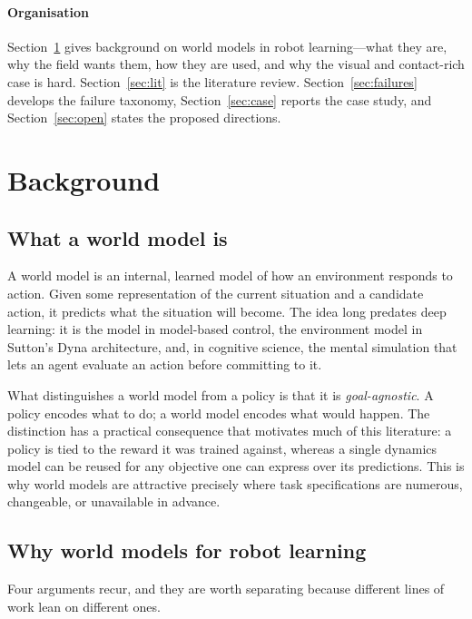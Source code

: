 \documentclass[11pt,letterpaper]{article}
\begin{document}
\paragraph{Organisation}
Section~\ref{sec:background} gives background on world models in robot
learning---what they are, why the field wants them, how they are used, and why
the visual and contact-rich case is hard. Section~\ref{sec:lit} is the
literature review. Section~\ref{sec:failures} develops the failure taxonomy,
Section~\ref{sec:case} reports the case study, and Section~\ref{sec:open} states
the proposed directions.

\section{Background}\label{sec:background}

\subsection{What a world model is}

A world model is an internal, learned model of how an environment responds to
action. Given some representation of the current situation and a candidate
action, it predicts what the situation will become. The idea long predates deep
learning: it is the model in model-based control, the environment model in
Sutton's Dyna architecture, and, in cognitive science, the mental simulation
that lets an agent evaluate an action before committing to it.

What distinguishes a world model from a policy is that it is
\emph{goal-agnostic}. A policy encodes what to do; a world model encodes what
would happen. The distinction has a practical consequence that motivates much of
this literature: a policy is tied to the reward it was trained against, whereas
a single dynamics model can be reused for any objective one can express over its
predictions. This is why world models are attractive precisely where task
specifications are numerous, changeable, or unavailable in advance.

\subsection{Why world models for robot learning}

Four arguments recur, and they are worth separating because different lines of
work lean on different ones.
\end{document}
